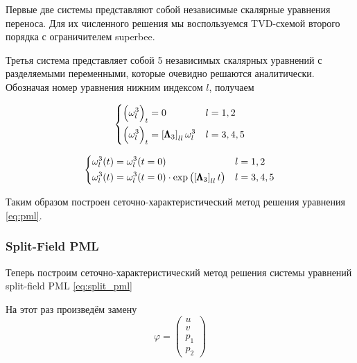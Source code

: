 Первые две системы представляют собой независимые скалярные уравнения переноса. Для их численного решения мы  воспользуемся TVD-схемой второго порядка с ограничителем superbee.
    
Третья система представляет собой 5 независимых скалярных уравнений с разделяемыми переменными, которые очевидно решаются аналитически. Обозначая номер уравнения нижним индексом $l$, получаем

\begin{equation*}
\begin{dcases}
    \left(\omega^3_l\right)_t = 0 & l=1,2\\
    \left(\omega^3_l\right)_t = \left[\pmb{\Lambda}_3\right]_{ll} \omega^3_l & l=3,4,5
\end{dcases}
\end{equation*}

\begin{equation*}
\begin{dcases}
    \omega^3_l(t) = \omega^3_l(t=0) & l=1,2 \\
    \omega^3_l(t) = \omega^3_l(t=0) \cdot \exp\left(\left[\pmb{\Lambda}_3\right]_{ll} t\right) & l = 3,4,5
\end{dcases}
\end{equation*}

Таким образом построен сеточно-характеристический метод решения уравнения \eqref{eq:pml}.

\subsubsection{Split-Field PML}

Теперь построим сеточно-характеристический метод решения системы уравнений split-field PML \eqref{eq:split_pml}

На этот раз произведём замену
\begin{equation}
	\varphi = \begin{pmatrix} u \\ v \\ p_1 \\ p_2 \end{pmatrix}
\end{equation}

